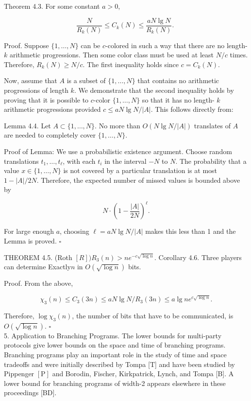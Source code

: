 \documentclass[10pt]{article}
\begin{document}
Theorem 4.3. For some constant $a>0$,

$$
\frac{N}{R_{k}(N)} \leq C_{k}(N) \leq \frac{a N \lg N}{R_{k}(N)} \text {. }
$$

Proof. Suppose $\{1, \ldots, N\}$ can be $c$-colored in such a way that there are no length- $k$ arithmetic progressions. Then some color class must be used at least $N / c$ times. Therefore, $R_{k}(N) \geq N / c$. The first inequality holds since $c=C_{k}(N)$.

Now, assume that $A$ is a subset of $\{1, \ldots, N\}$ that contains no arithmetic progressions of length $k$. We demonstrate that the second inequality holds by proving that it is possible to $c$-color $\{1, \ldots, N\}$ so that it has no length- $k$ arithmetic progressions provided $c \leq a N \lg N /|A|$. This follows directly from:

Lemma 4.4. Let $A \subset\{1, \ldots, N\}$. No more than $O(N \lg N /|A|)$ translates of $A$ are needed to completely cover $\{1, \ldots, N\}$.

Proof of Lemma: We use a probabilistic existence argument. Choose random translations $t_{1}, \ldots, t_{\ell}$, with each $t_{i}$ in the interval $-N$ to $N$. The probability that a value $x \in\{1, \ldots, N\}$ is not covered by a particular translation is at most $1-|A| / 2 N$. Therefore, the expected number of missed values is bounded above by

$$
N \cdot\left(1-\frac{|A|}{2 N}\right)^{\ell} .
$$

For large enough $a$, choosing $\ell=a N \lg N /|A|$ makes this less than 1 and the Lemma is proved. \(\square\)

THEOREM 4.5. (Roth $[R]) R_{3}(n)>n e^{-c \sqrt{\log n}}$. Corollary 4.6. Three players can determine Exactly$n$ in $O(\sqrt{\log n})$ bits.

Proof. From the above,

$$
\chi_{3}(n) \leq C_{3}(3 n) \leq a N \lg N / R_{3}(3 n) \leq a \lg n e^{c \sqrt{\log n}} .
$$

Therefore, $\log \chi_{3}(n)$, the number of bits that have to be communicated, is $O(\sqrt{\log n})$. \(\square\)\\[0pt]
5. Application to Branching Programs. The lower bounds for multi-party protocols give lower bounds on the space and time of branching programs. Branching programs play an important role in the study of time and space tradeoffs and were initially described by Tompa [T] and have been studied by Pippenger $[\mathrm{P}]$ and Borodin, Fischer, Kirkpatrick, Lynch, and Tompa [B]. A lower bound for branching programs of width-2 appears elsewhere in these proceedings [BD].
\end{document}
